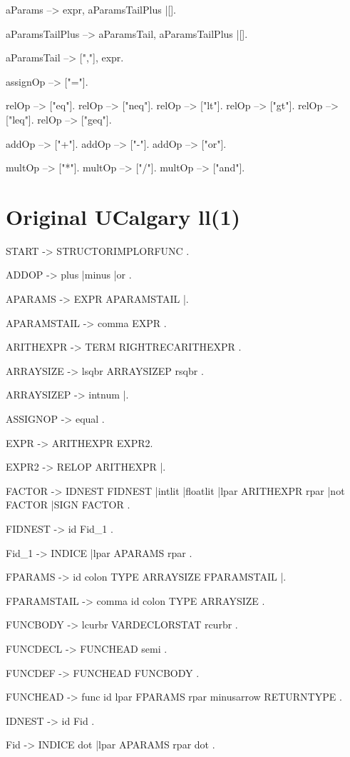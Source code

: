 \documentclass{article}
\begin{document}
aParams --> expr, aParamsTailPlus
	    |[].

aParamsTailPlus --> aParamsTail, aParamsTailPlus
		    |[].

aParamsTail --> [","], expr.

assignOp --> ["="].

relOp --> ["eq"].
relOp --> ["neq"].
relOp --> ["lt"].
relOp --> ["gt"].
relOp --> ["leq"].
relOp --> ["geq"].

addOp --> ["+"].
addOp --> ["-"].
addOp --> ["or"].

multOp --> ["*"].
multOp --> ["/"].
multOp --> ["and"].

\section{Original UCalgary ll(1)}
START -> STRUCTORIMPLORFUNC .

ADDOP -> plus 
        |minus 
        |or .

APARAMS -> EXPR APARAMSTAIL 
          |.

APARAMSTAIL -> comma EXPR .

ARITHEXPR -> TERM RIGHTRECARITHEXPR .

ARRAYSIZE -> lsqbr ARRAYSIZEP rsqbr .

ARRAYSIZEP -> intnum 
             |.

ASSIGNOP -> equal .

EXPR ->  ARITHEXPR EXPR2.

EXPR2 -> RELOP ARITHEXPR
      |.

FACTOR -> IDNEST FIDNEST 
         |intlit 
         |floatlit 
         |lpar ARITHEXPR rpar 
         |not FACTOR 
         |SIGN FACTOR .

FIDNEST -> id Fid\_1 .

Fid\_1 -> INDICE 
        |lpar APARAMS rpar .

FPARAMS -> id colon TYPE ARRAYSIZE FPARAMSTAIL 
          |.

FPARAMSTAIL -> comma id colon TYPE ARRAYSIZE .

FUNCBODY -> lcurbr VARDECLORSTAT rcurbr .

FUNCDECL -> FUNCHEAD semi .

FUNCDEF -> FUNCHEAD FUNCBODY .

FUNCHEAD -> func id lpar FPARAMS rpar minusarrow RETURNTYPE .

IDNEST ->  id Fid .

Fid -> INDICE dot 
      |lpar APARAMS rpar dot .
\end{document}
